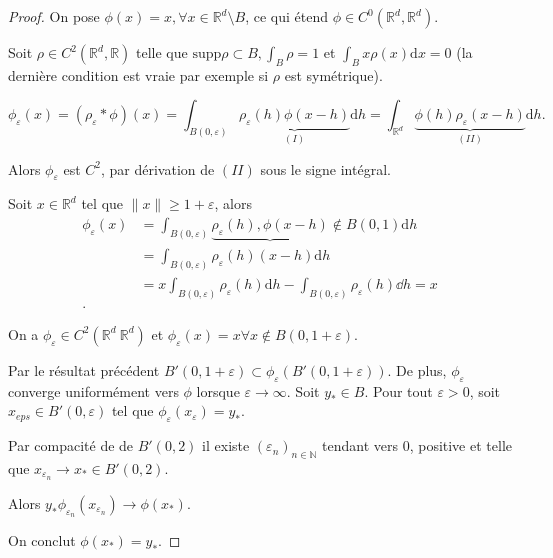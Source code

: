 \begin{proof}
On pose $\phi\left( x \right) =x, \forall x \in \mathbb{R}^d \setminus B$, ce qui étend $\phi \in C^0 \left( \mathbb{R}^d, \mathbb{R}^d  \right) $.

Soit $\rho \in C^2\left( \mathbb{R}^d, \mathbb{R} \right) $ telle que $\text{supp} \rho \subset B, \int_{B} \rho =1$ et $\int_B x\rho\left( x \right) \mathrm{d} x=0$ (la dernière condition est vraie par exemple si $\rho$ est symétrique).

$$ \phi_\varepsilon\left( x \right) = \left( \rho_\varepsilon * \phi \right)\left( x \right) = \int_{B\left( 0, \varepsilon \right) } \underbrace{\rho_\varepsilon\left( h \right)  \phi\left( x-h \right)}_{(I)} \mathrm{d} h = \int_{\mathbb{R}^d } \underbrace{\phi\left( h \right) \rho_\varepsilon\left( x-h \right)}_{\left( II \right) } \mathrm{d} h.$$

Alors $\phi_{\varepsilon}$ est $C^2$, par dérivation de $\left( II \right) $ sous le signe intégral.

Soit $x \in  \mathbb{R}^d $ tel que $\|x\|\ge 1 +\varepsilon$, alors 
\begin{align*}
	\phi_{\varepsilon}\left( x \right) &= \int_{B\left( 0, \varepsilon \right) } \underbrace{\rho_{\varepsilon} \left( h \right), \phi\left( x-h \right)}{ \not\in B\left( 0,1 \right) } \mathrm{d} h\\
	&= \int_{B\left( 0, \varepsilon \right) } \rho_{\varepsilon}\left( h \right) \left( x-h \right) \mathrm{d} h \\
	&= x \int_{B\left( 0, \varepsilon \right) } \rho_{\varepsilon}\left( h \right) \mathrm{d} h - \int_{B\left( 0, \varepsilon \right) } \rho_{\varepsilon}\left( h \right) \dd h =x \\
.\end{align*} 

On a $ \phi_{\varepsilon} \in C^2\left( \mathbb{R}^d \ \mathbb{R}^d  \right) $ et $\phi_{\varepsilon}\left( x \right) =x \forall x \not\in B\left( 0, 1 + \varepsilon \right) $.

Par le résultat précédent $B'\left( 0, 1+ \varepsilon \right) \subset  \phi_{\varepsilon}\left( B'\left( 0, 1 + \varepsilon \right)  \right) $. De plus, $\phi_{\varepsilon}$ converge uniformément vers $\phi$ lorsque $ \varepsilon \to \infty$. Soit $y_* \in B.$ Pour tout $\varepsilon>0$, soit  $x_{eps} \in B'\left( 0, \varepsilon \right) $ tel que $ \phi_{\varepsilon}\left( x_{\varepsilon} \right) = y_{*}$.

Par compacité de de $B'\left( 0,2 \right) $ il existe $\left( \varepsilon_{n} \right) _{n\in \mathbb{N}}$ tendant vers 0, positive et telle que $x_{\varepsilon_n} \to x_* \in B'\left(0,2  \right) $.

Alors $ y_* \phi_{\varepsilon_n}\left( x_{\varepsilon_n} \right) \to \phi\left( x_* \right) $.

On conclut $ \phi\left( x_* \right) = y_*$.
\end{proof}

